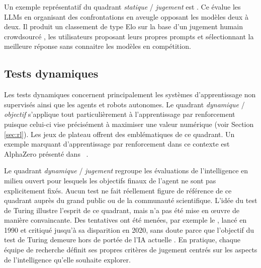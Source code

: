 


Un exemple représentatif du quadrant \emph{statique} / \emph{jugement} est  \cite{chiang_chatbot_2024}.
Ce  évalue les LLMs en organisant des confrontations en aveugle opposant les modèles deux à deux.
Il produit un classement de type Elo sur la base d'un jugement humain \og crowdsourcé \fg, les utilisateurs proposant leurs propres prompts et sélectionnant la meilleure réponse sans connaitre les modèles en compétition. 

\subsection{Tests dynamiques}

\noindent
Les tests dynamiques concernent principalement les systèmes d'apprentissage non supervisés ainsi que les agents et robots autonomes. 
Le quadrant \emph{dynamique} / \emph{objectif} s'applique tout particulièrement à l'apprentissage par renforcement puisque celui-ci vise précisément à maximiser une valeur numérique (voir Section \ref{sec:rl}). 
Les jeux de plateau offrent des  emblématiques de ce quadrant. 
Un exemple marquant d'apprentissage par renforcement dans ce contexte est AlphaZero présenté dans \og {} \fg\ \cite{silver_general_2018}.

Le quadrant \emph{dynamique} / \emph{jugement} regroupe les évaluations de l'intelligence  en milieu ouvert pour lesquels les objectifs finaux de l'agent ne sont pas explicitement fixés. 
Aucun test ne fait réellement figure de référence de ce quadrant auprès du grand public ou de la communauté scientifique.
L'idée du test de Turing illustre l’esprit de ce quadrant, mais n'a pas été mise en \oe uvre de manière convaincante. 
Des tentatives ont été menées, par exemple le , lancé en 1990 et critiqué jusqu'à sa disparition en 2020, sans doute parce que l’objectif du test de Turing demeure hors de portée de l'IA actuelle \cite{powers_total_1998}.
En pratique, chaque équipe de recherche définit ses propres critères de jugement centrés sur les aspects de l'intelligence qu'elle souhaite explorer. 

